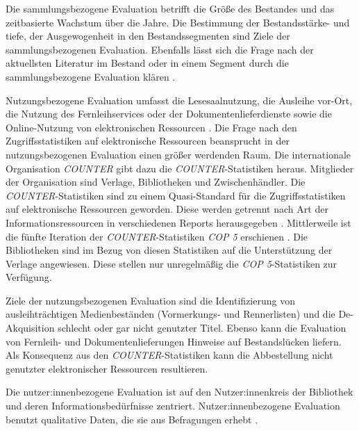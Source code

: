 Die sammlungsbezogene Evaluation betrifft die Größe des Bestandes und das zeitbasierte Wachstum über die Jahre. Die Bestimmung der Bestandsstärke- und tiefe, 
der Ausgewogenheit in den Bestandssegmenten sind Ziele der sammlungsbezogenen Evaluation. 
Ebenfalls lässt sich die Frage nach der aktuellsten Literatur im Bestand oder in einem Segment durch die sammlungsbezogene Evaluation klären
\cite[vgl.][48 f.]{lyons_lucy_eleonore_collection_2010}.

Nutzungsbezogene Evaluation umfasst die Lesesaalnutzung, die Ausleihe vor-Ort, die Nutzung des Fernleihservices oder der Dokumentenlieferdienste 
sowie die Online-Nutzung von elektronischen Ressourcen \cite[vgl.][254 ff.]{johannsen_jochen_bestands-_2015}.
Die Frage nach den Zugriffsstatistiken auf elektronische Ressourcen beansprucht in der nutzungsbezogenen Evaluation einen größer werdenden Raum.
Die internationale Organisation \textit{\acrfull{COUNTER}} gibt dazu die \textit{\acrshort{COUNTER}}-Statistiken heraus. Mitglieder der Organisation sind Verlage, Bibliotheken
und Zwischenhändler. Die \textit{\acrshort{COUNTER}}-Statistiken sind zu einem Quasi-Standard für die Zugriffsstatistiken 
auf elektronische Ressourcen geworden. Diese werden getrennt nach Art der Informationsressourcen in verschiedenen Reports herausgegeben \cite[vgl.][260 ff.]{johannsen_jochen_bestands-_2015}. 
Mittlerweile ist die fünfte Iteration der \textit{\acrshort{COUNTER}}-Statistiken \textit{\acrshort{COP 5}} erschienen \cite[vgl.][]{counter_abstract_2020}.
Die Bibliotheken sind im Bezug von diesen Statistiken auf die Unterstützung der Verlage angewiesen. Diese stellen nur unregelmäßig die \textit{\acrshort{COP 5}}-Statistiken zur
Verfügung. 

Ziele der nutzungsbezogenen Evaluation sind die Identifizierung von ausleihträchtigen Medienbeständen (Vormerkungs- und Rennerlisten) und
die De-Akquisition schlecht oder gar nicht genutzter Titel. Ebenso kann die Evaluation von Fernleih- und Dokumentenlieferungen Hinweise auf Bestandslücken liefern.
Als Konsequenz aus den \textit{\acrshort{COUNTER}}-Statistiken kann die Abbestellung nicht genutzter elektronischer Ressourcen resultieren.

Die nutzer:innenbezogene Evaluation ist auf den Nutzer:innenkreis der Bibliothek und deren Informationsbedürfnisse zentriert. 
Nutzer:innenbezogene Evaluation benutzt qualitative Daten, die sie aus Befragungen erhebt
\cites[vgl.][255 ff.]{johannsen_jochen_bestands-_2015}[vgl.][302]{johnson_peggy_fundamentals_2014}.

